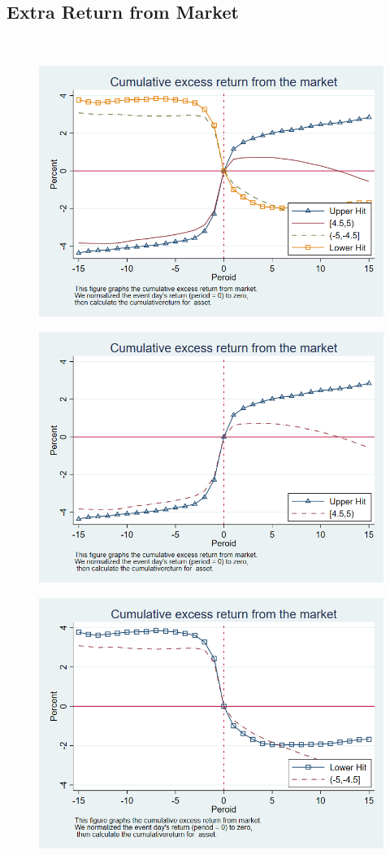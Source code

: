 \documentclass[12pt]{article}
\begin{document}
%
\begin{appendices}

\section{Extra Return from Market}



‌ %
‌ %


\begin{figure}[htbp]
\centering
\includegraphics[width=0.7\linewidth]{TER}
\caption{}
\label{fig:ter}
\end{figure}


\begin{figure}[htbp]
\centering
\includegraphics[width=0.7\linewidth]{CUER}
\caption{}
\label{fig:cuer}
\end{figure}


\begin{figure}[htbp]
\centering
\includegraphics[width=0.7\linewidth]{CLER}
\caption{}
\label{fig:cler}
\end{figure}


\end{appendices}
\end{document}

